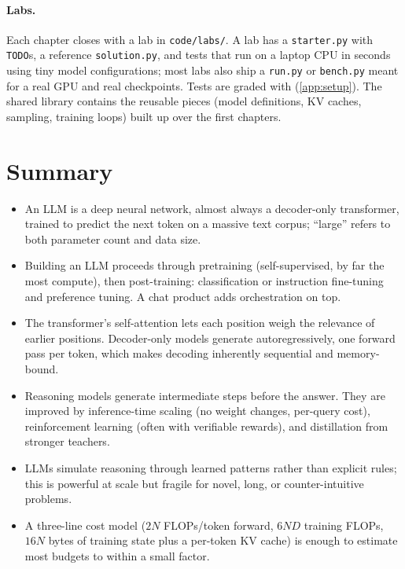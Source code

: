 \paragraph{Labs.}
Each chapter closes with a lab in \texttt{code/labs/}. A lab has a \texttt{starter.py} with \texttt{TODO}s,
a reference \texttt{solution.py}, and tests that run on a laptop CPU in seconds using tiny model
configurations; most labs also ship a \texttt{run.py} or \texttt{bench.py} meant for a real GPU and real
checkpoints. Tests are graded with  (\cref{app:setup}). The shared library 
contains the reusable pieces (model definitions, KV caches, sampling, training loops) built up over the
first chapters.

\section{Summary}\label{sec:landscape:summary}
\begin{itemize}
\item An LLM is a deep neural network, almost always a decoder-only transformer, trained to predict the
  next token on a massive text corpus; ``large'' refers to both parameter count and data size.
\item Building an LLM proceeds through pretraining (self-supervised, by far the most compute), then
  post-training: classification or instruction fine-tuning and preference tuning. A chat product adds
  orchestration on top.
\item The transformer's self-attention lets each position weigh the relevance of earlier positions.
  Decoder-only models generate autoregressively, one forward pass per token, which makes decoding
  inherently sequential and memory-bound.
\item Reasoning models generate intermediate steps before the answer. They are improved by
  inference-time scaling (no weight changes, per-query cost), reinforcement learning (often with
  verifiable rewards), and distillation from stronger teachers.
\item LLMs simulate reasoning through learned patterns rather than explicit rules; this is powerful at
  scale but fragile for novel, long, or counter-intuitive problems.
\item A three-line cost model ($2N$ FLOPs/token forward, $6ND$ training FLOPs, $16N$ bytes of training state
  plus a per-token KV cache) is enough to estimate most budgets to within a small factor.
\end{itemize}


